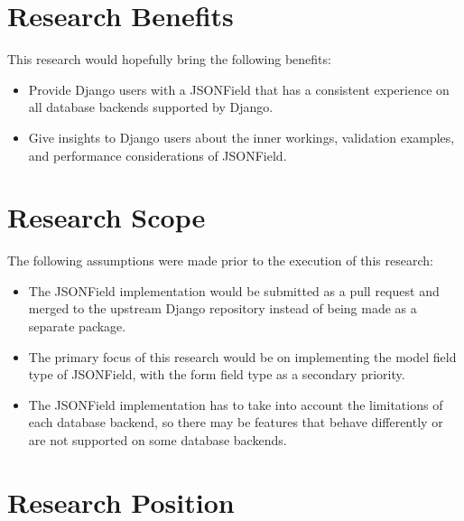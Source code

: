 \section{Research Benefits}

This research would hopefully bring the following benefits:

\begin{itemize}
    \item Provide Django users with a JSONField that has a consistent
          experience on all database backends supported by Django.
    \item Give insights to Django users about the inner workings, validation
          examples, and performance considerations of JSONField.
\end{itemize}

\section{Research Scope}

The following assumptions were made prior to the execution of this research:

\begin{itemize}
    \item The JSONField implementation would be submitted as a pull request and
          merged to the upstream Django repository instead of being made as a
          separate package.
    \item The primary focus of this research would be on implementing the model
          field type of JSONField, with the form field type as a secondary
          priority.
    \item The JSONField implementation has to take into account the limitations
          of each database backend, so there may be features that behave
          differently or are not supported on some database backends.
\end{itemize}

\section{Research Position}

